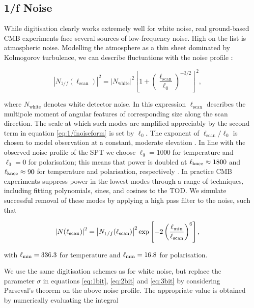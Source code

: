 \documentclass[apj]{emulateapj}
\newcommand{\lknee}{\ensuremath{\ell_{\rm knee}}}
\newcommand{\lcut}{\ensuremath{\ell_{\rm min}}}
\begin{document}
\subsection{1/f Noise}
\label{subsec:oofnoise}

While digitisation clearly works extremely well for white noise, real ground-based CMB experiments face several sources of low-frequency noise. High on the list is atmospheric noise. Modelling the atmosphere as a thin sheet dominated by Kolmogorov turbulence, we can describe fluctuations with the noise profile \citep{lay2000}:

\begin{equation} \label{eq:1/fnoiseform}
\left| N_{1/f}(\ell_{\mathrm{scan}}) \right|^2 = \left| N_{\mathrm{white}} \right|^2 \left[ 1 + \left( \frac{\ell_{\mathrm{scan}}}{\ell_0} \right)^{-3/2} \right]^2,
\end{equation}


where $N_{\mathrm{white}}$ denotes white detector noise. In this expression $\ell_{\mathrm{scan}}$ describes the multipole moment of angular features of corresponding size along the scan direction. The scale at which such modes are amplified appreciably by the second term in equation \ref{eq:1/fnoiseform} is set by $\ell_0$. The exponent of $\ell_{\mathrm{scan}}/\ell_0$ is chosen to model observation at a constant, moderate elevation \citep{lay1997}. In line with the observed noise profile of the SPT we choose $\ell_0 = 1000$ for temperature and $\ell_0 = 0$ for polarisation; this means that power is doubled at $\lknee \approx 1800$ and $\lknee \approx 90$ for temperature and polarisation, respectively \citep{henning2018}. In practice CMB experiments suppress power in the lowest modes through a range of techniques, including fitting polynomials, sines, and cosines to the TOD. We simulate successful removal of these modes by applying a high pass filter to the noise, such that

\begin{equation} \label{eq:1/fnoiseformfinal}
\left| N (\ell_{\mathrm{scan}}) \right|^2 = \left| N_{1/f}(\ell_{\mathrm{scan}}) \right|^2 \exp\left[ -2\left( \frac{\lcut}{\ell_{\mathrm{scan}}} \right)^{6} \right],
\end{equation}

with $\lcut = 336.3$ for temperature and $\lcut = 16.8$ for polarisation.

We use the same digitisation schemes as for white noise, but replace the parameter $\sigma$ in equations \ref{eq:1bit}, \ref{eq:2bit} and \ref{eq:3bit} by considering Parseval's theorem on the above noise profile. The appropriate value is obtained by numerically evaluating the integral
\end{document}
